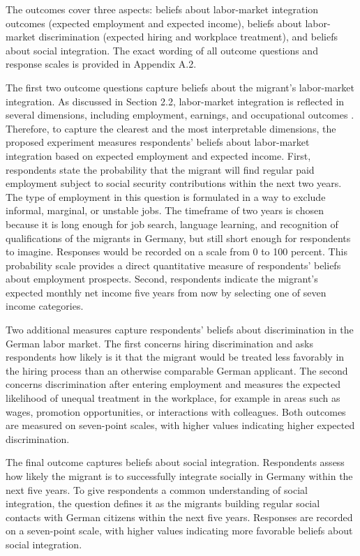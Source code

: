 The outcomes cover three aspects: beliefs about labor-market integration outcomes (expected employment and expected income), 
beliefs about labor-market discrimination (expected hiring and workplace treatment), and beliefs about social 
integration. The exact wording of all outcome questions and response scales is provided in Appendix A.2.

The first two outcome questions capture beliefs about the migrant's labor-market integration. 
As discussed in Section 2.2, labor-market integration is reflected in several dimensions, including employment, 
earnings, and occupational outcomes \citep{brell2020labor, fasani2024refugees}. Therefore, to capture the clearest
and the most interpretable dimensions, the proposed experiment measures respondents' beliefs about labor-market 
integration based on expected employment and expected income.
First, respondents state the probability that the migrant will find regular paid employment subject to social security 
contributions within the next two years. The type of employment in this question is formulated in a way to exclude 
informal, marginal, or unstable jobs. The timeframe of two years is chosen because it is long enough for job search, 
language learning, and recognition of qualifications of the migrants in Germany, but still short enough for respondents 
to imagine. Responses would be recorded on a scale from 0 to 100 percent. This probability scale provides a direct 
quantitative measure of respondents' beliefs about employment prospects. 
Second, respondents indicate the migrant's expected monthly net income five years from now by selecting one of seven 
income categories.

Two additional measures capture respondents' beliefs about discrimination in the German labor market. The first concerns 
hiring discrimination and asks respondents how likely is it that the migrant would be treated less favorably in the 
hiring process than an otherwise comparable German applicant. The second concerns discrimination after entering 
employment and measures the expected likelihood of unequal treatment in the workplace, for example in areas such as 
wages, promotion opportunities, or interactions with colleagues. Both outcomes are measured on seven-point scales, 
with higher values indicating higher expected discrimination.

The final outcome captures beliefs about social integration. Respondents assess how likely the migrant is to 
successfully integrate socially in Germany within the next five years. To give respondents a common understanding of 
social integration, the question defines it as the migrants building regular social contacts with German citizens within
the next five years. Responses are recorded on a seven-point scale, with higher values indicating more favorable 
beliefs about social integration.

